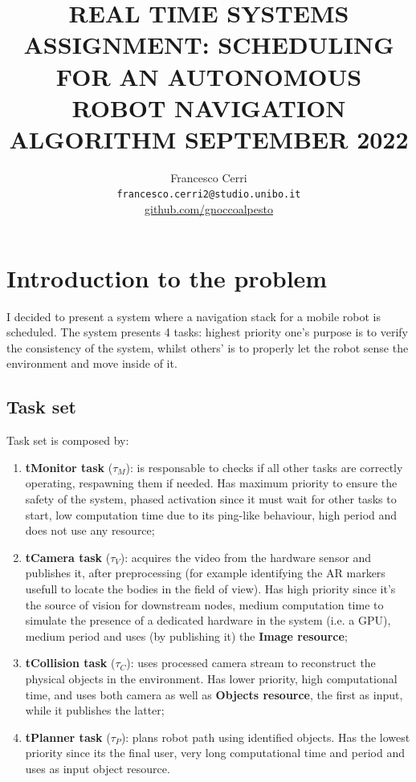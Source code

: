 \documentclass{article}
\title{REAL TIME SYSTEMS ASSIGNMENT: SCHEDULING FOR AN AUTONOMOUS \newline ROBOT NAVIGATION ALGORITHM\newline\newline30 SEPTEMBER 2022 }
\author{
  Francesco Cerri\\
  \texttt{francesco.cerri2@studio.unibo.it} \\
  \hyperlink{github.com/gnoccoalpesto}{github.com/gnoccoalpesto}
}
\begin{document}
\maketitle




\section{Introduction to the problem}               \label{intro}

I decided to present a system where a navigation stack for a mobile robot is scheduled. The system presents 4 tasks: highest priority one's purpose is to verify the consistency of the system, whilst others' is to properly let the robot sense the environment and move inside of it.

\subsection{Task set}                               \label{tasks}

Task set is composed by:

\begin{enumerate}
    \item \textbf{tMonitor task} ($\tau_{M}$): is responsable to checks if all other tasks are correctly operating, respawning them if needed. Has maximum priority to ensure the safety of the system, phased activation since it must wait for other tasks to start, low computation time due to its ping-like behaviour, high period and does not use any resource;
    
    \item \textbf{tCamera task} ($\tau_{V}$):  acquires the video from the hardware sensor and publishes it, after preprocessing (for example identifying the AR markers usefull to locate the bodies in the field of view). Has high priority since it's the source of vision for downstream nodes, medium computation time to simulate the presence of a dedicated hardware in the system (i.e. a GPU), medium period and uses (by publishing it) the \textbf{Image resource};
    
    \item \textbf{tCollision task} ($\tau_{C}$): uses processed camera stream to reconstruct the physical objects in the environment. Has lower priority, high computational time, and uses both camera as well as \textbf{Objects resource}, the first as input, while it publishes the latter;
    
    \item \textbf{tPlanner task} ($\tau_{P}$): plans robot path using identified objects. Has the lowest priority since its the final user, very long computational time and period and uses as input object resource.
\end{enumerate}
\end{document}
